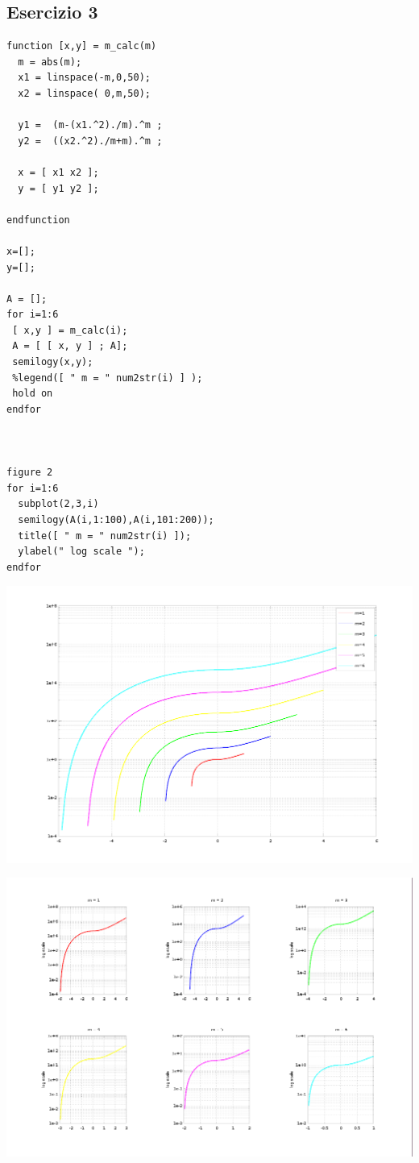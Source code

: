\documentclass{article}
\begin{document}
\subsection{ Esercizio 3}
\begin{lstlisting}
function [x,y] = m_calc(m)
  m = abs(m);
  x1 = linspace(-m,0,50);
  x2 = linspace( 0,m,50);
  
  y1 =  (m-(x1.^2)./m).^m ;
  y2 =  ((x2.^2)./m+m).^m ;

  x = [ x1 x2 ];
  y = [ y1 y2 ];

endfunction

x=[];
y=[];

A = [];
for i=1:6
 [ x,y ] = m_calc(i);
 A = [ [ x, y ] ; A];
 semilogy(x,y);
 %legend([ " m = " num2str(i) ] );
 hold on
endfor



figure 2
for i=1:6
  subplot(2,3,i)
  semilogy(A(i,1:100),A(i,101:200));
  title([ " m = " num2str(i) ]);
  ylabel(" log scale ");
endfor
\end{lstlisting}

\newpage
\centerline{\includegraphics[scale=0.4]{ex53a.png}}
\centerline{\includegraphics[scale=0.4]{ex53b.png}}
\end{document}
